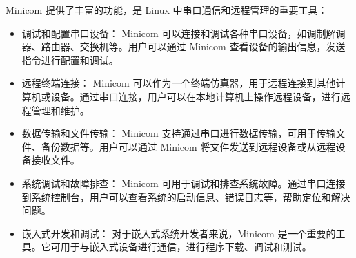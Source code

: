 Minicom 提供了丰富的功能，是 Linux 中串口通信和远程管理的重要工具：

\begin{itemize}
	\item 调试和配置串口设备： Minicom 可以连接和调试各种串口设备，如调制解调器、路由器、交换机等。用户可以通过 Minicom 查看设备的输出信息，发送指令进行配置和调试。

	\item 远程终端连接： Minicom 可以作为一个终端仿真器，用于远程连接到其他计算机或设备。通过串口连接，用户可以在本地计算机上操作远程设备，进行远程管理和维护。

	\item 数据传输和文件传输： Minicom 支持通过串口进行数据传输，可用于传输文件、备份数据等。用户可以通过 Minicom 将文件发送到远程设备或从远程设备接收文件。

	\item 系统调试和故障排查： Minicom 可用于调试和排查系统故障。通过串口连接到系统控制台，用户可以查看系统的启动信息、错误日志等，帮助定位和解决问题。

	\item 嵌入式开发和调试： 对于嵌入式系统开发者来说，Minicom 是一个重要的工具。它可用于与嵌入式设备进行通信，进行程序下载、调试和测试。
\end{itemize}
